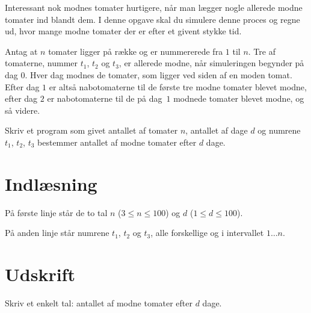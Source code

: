 
Interessant nok modnes tomater hurtigere, når man lægger nogle allerede modne tomater ind blandt dem.
I denne opgave skal du simulere denne proces og regne ud, hvor mange modne tomater der er efter et givent stykke tid.

Antag at $n$ tomater ligger på række og er nummererede fra $1$ til $n$.
Tre af tomaterne, nummer $t_1$, $t_2$ og $t_3$, er allerede modne, når simuleringen begynder på dag $0$.
Hver dag modnes de tomater, som ligger ved siden af en moden tomat.
Efter dag $1$ er altså nabotomaterne til de første tre modne tomater blevet modne, efter dag $2$ er nabotomaterne til de på dag~$1$ modnede tomater blevet modne, og så videre.

Skriv et program som givet antallet af tomater $n$, antallet af dage $d$ og numrene $t_1$, $t_2$, $t_3$ bestemmer antallet af modne tomater efter $d$ dage.

\section*{Indlæsning}

På første linje står de to tal $n$ ($3 \le n \le 100$) og $d$ ($1 \le d \le 100$).

På anden linje står numrene $t_1$, $t_2$ og $t_3$, alle forskellige og i intervallet $1 \dots n$.

\section*{Udskrift}
Skriv et enkelt tal: antallet af modne tomater efter $d$ dage.
